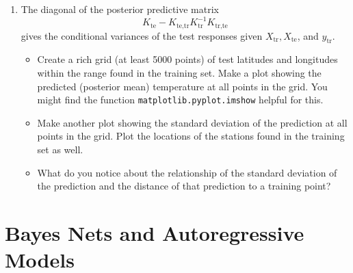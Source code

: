 \documentclass{article}
\begin{document}
\begin{enumerate}
\begin{enumerate}
\item The diagonal of the posterior predictive matrix
    \[
    K_{\text{te}} - K_{\text{te,tr}} K_{\text{tr}}^{-1} K_{\text{tr,te}}
    \]
    gives the conditional variances of the test responses given $X_{\text{tr}}, X_{\text{te}}$, and $y_{\text{tr}}$.

    \begin{itemize}
    \item Create a rich grid (at least 5000 points) of test latitudes and longitudes within the range found in the training set. Make a plot showing the predicted (posterior mean) temperature at all points in the grid. You might find the function \texttt{matplotlib.pyplot.imshow} helpful for this.
    \item Make another plot showing the standard deviation of the prediction at all points in the grid. Plot the locations of the stations found in the training set as well.
    \item What do you notice about the relationship of the standard deviation of the prediction and the distance of that prediction to a training point?
    \end{itemize}
\end{enumerate}
\end{enumerate} %

\section*{Bayes Nets and Autoregressive Models}
\end{document}
